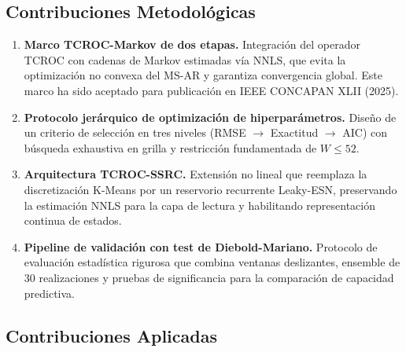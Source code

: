 \subsection{Contribuciones Metodológicas}

\begin{enumerate}
    \item \textbf{Marco TCROC-Markov de dos etapas.}  Integración
    del operador TCROC con cadenas de Markov estimadas vía NNLS,
    que evita la optimización no convexa del MS-AR y garantiza
    convergencia global.  Este marco ha sido aceptado para
    publicación en IEEE CONCAPAN XLII (2025).

    \item \textbf{Protocolo jerárquico de optimización de
    hiperparámetros.}  Diseño de un criterio de selección en tres
    niveles (RMSE $\to$ Exactitud $\to$ AIC) con búsqueda exhaustiva
    en grilla y restricción fundamentada de $W \le 52$.

    \item \textbf{Arquitectura TCROC-SSRC.}  Extensión no lineal
    que reemplaza la discretización K-Means por un reservorio
    recurrente Leaky-ESN, preservando la estimación NNLS para la
    capa de lectura y habilitando representación continua de estados.

    \item \textbf{Pipeline de validación con test de
    Diebold-Mariano.}  Protocolo de evaluación estadística rigurosa
    que combina ventanas deslizantes, ensemble de 30 realizaciones y
    pruebas de significancia para la comparación de capacidad
    predictiva.
\end{enumerate}

\subsection{Contribuciones Aplicadas}


